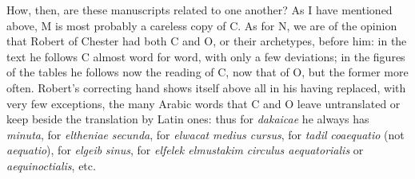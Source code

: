 \documentclass[11pt]{article}
\newcommand{\Pg}[1]{\marginpar{\footnotesize\color{gray}#1}}
\begin{document}
\par \Pg{XIII}How, then, are these manuscripts related to one another? As I have mentioned above, M is most probably a careless copy of C. As for N, we are of the opinion that Robert of Chester had both C and O, or their archetypes, before him: in the text he follows C almost word for word, with only a few deviations; in the figures of the tables he follows now the reading of C, now that of O, but the former more often. Robert's correcting hand shows itself above all in his having replaced, with very few exceptions, the many Arabic words that C and O leave untranslated or keep beside the translation by Latin ones: thus for \emph{dakaicae} he always has \emph{minuta}, for \emph{eltheniae} \emph{secunda}, for \emph{elwacat} \emph{medius cursus}, for \emph{tadil} \emph{coaequatio} (not \emph{aequatio}), for \emph{elgeib} \emph{sinus}, for \emph{elfelek elmustakim} \emph{circulus aequatorialis} or \emph{aequinoctialis}, etc.\par
\end{document}
